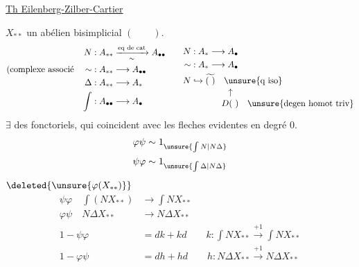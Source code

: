 \uline{Th Eilenberg-Zilber-Cartier}\hfill{}

\(X_{**}\) un  abélien bisimplicial \((\qquad)\).
\[
\begin{aligned}
N &: A_{**}\xrightarrow[\sim]{\text{eq de cat}} A_{\bullet\bullet}\\
\text{(complexe associé}\quad \sim &: A_{**}\longrightarrow A_{\bullet\bullet}\\
\Delta &: A_{**}\longrightarrow A_*\\
\int &: A_{\bullet\bullet}\longrightarrow A_\bullet
\end{aligned}
\qquad
\begin{aligned}
N &: A_*\longrightarrow A_\bullet\\
\sim &: A_*\longrightarrow A_\bullet\\
N&\hookrightarrow \widetilde{(\ )}\quad\unsure{\text{q iso}}\\[-2pt]
&\hspace{4em}\uparrow\\[-2pt]
&\hspace{3.5em}D(\ )\quad\unsure{\text{degen homot triv}}
\end{aligned}
\]
\(\exists\) des  fonctoriels,
 qui coincident avec les fleches evidentes en degré 0.
\[
\begin{aligned}
\varphi\psi&\sim1_{\unsure{\int N|N\Delta}}\\
\psi\varphi&\sim1_{\unsure{\int\Delta|N\Delta}}
\end{aligned}
\]
\(\deleted{\unsure{\varphi(X_{**})}}\)
\[
\begin{aligned}
\psi\varphi\quad\int (NX_{**})&\longrightarrow\int NX_{**}\\
\varphi\psi\quad N\Delta X_{**}&\longrightarrow N\Delta X_{**}\\
1-\psi\varphi&=dk+kd\qquad k:\int NX_{**}\xrightarrow{+1}\int NX_{**}\\
1-\varphi\psi&=dh+hd\qquad h:N\Delta X_{**}\xrightarrow{+1}N\Delta X_{**}
\end{aligned}
\]
